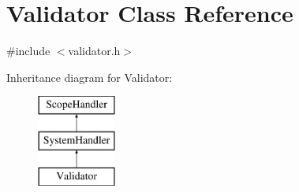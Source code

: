 \hypertarget{classValidator}{}\section{Validator Class Reference}
\label{classValidator}


{\ttfamily \#include $<$validator.\+h$>$}

Inheritance diagram for Validator\+:\begin{figure}[H]
\begin{center}
\leavevmode
\includegraphics[height=3.000000cm]{classValidator}
\end{center}
\end{figure}
